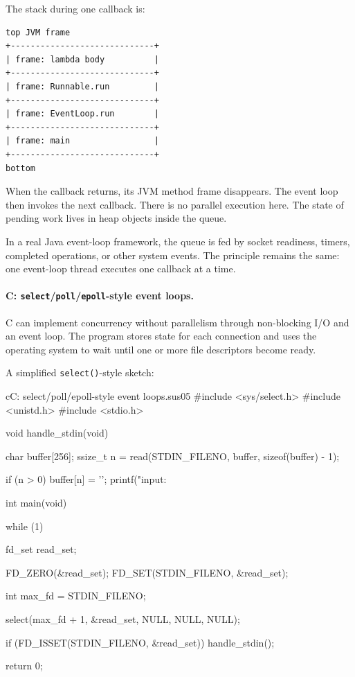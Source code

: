 The stack during one callback is:

\begin{verbatim}
top JVM frame
+-----------------------------+
| frame: lambda body          |
+-----------------------------+
| frame: Runnable.run         |
+-----------------------------+
| frame: EventLoop.run        |
+-----------------------------+
| frame: main                 |
+-----------------------------+
bottom
\end{verbatim}

When the callback returns, its JVM method frame disappears. The event loop then invokes the next callback. There is no parallel execution here. The state of pending work lives in heap objects inside the queue.

In a real Java event-loop framework, the queue is fed by socket readiness, timers, completed operations, or other system events. The principle remains the same: one event-loop thread executes one callback at a time.

\paragraph{C: \texttt{select}/\texttt{poll}/\texttt{epoll}-style event loops.}

C can implement concurrency without parallelism through non-blocking I/O and an event loop. The program stores state for each connection and uses the operating system to wait until one or more file descriptors become ready.

A simplified \texttt{select()}-style sketch:

\begin{codebox}[]{c}{C: select/poll/epoll-style event loops.}{sus05}
#include <sys/select.h>
#include <unistd.h>
#include <stdio.h>

void handle_stdin(void) {
    char buffer[256];
    ssize_t n = read(STDIN_FILENO, buffer, sizeof(buffer) - 1);

    if (n > 0) {
        buffer[n] = '\0';
        printf("input: %
    }
}

int main(void) {
    while (1) {
        fd_set read_set;

        FD_ZERO(&read_set);
        FD_SET(STDIN_FILENO, &read_set);

        int max_fd = STDIN_FILENO;

        select(max_fd + 1, &read_set, NULL, NULL, NULL);

        if (FD_ISSET(STDIN_FILENO, &read_set)) {
            handle_stdin();
        }
    }

    return 0;
}
\end{codebox}


